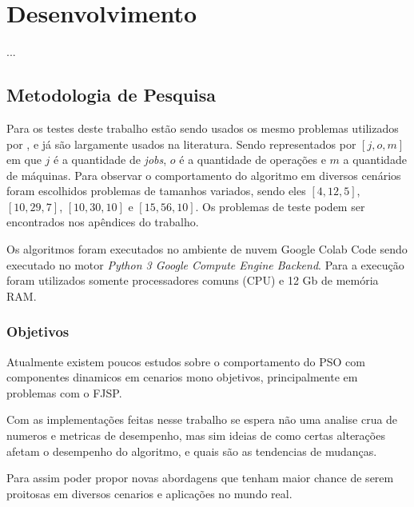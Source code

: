\chapter{Desenvolvimento}
    ...


\section{Metodologia de Pesquisa}
        Para os testes deste trabalho estão sendo usados os mesmo problemas utilizados por \cite{Kacem2002}, e já são largamente usados na literatura. Sendo representados por $[j, o, m]$ em que $j$ é a quantidade de \textit{jobs}, $o$ é a quantidade de operações e $m$ a quantidade de máquinas. Para observar o comportamento do algoritmo em diversos cenários foram escolhidos problemas de tamanhos variados, sendo eles $[4, 12, 5]$, $[10, 29, 7]$, $[10, 30, 10]$ e $[15, 56, 10]$. Os problemas de teste podem ser encontrados nos apêndices do trabalho.\newline

        Os algoritmos foram executados no ambiente de nuvem Google Colab Code sendo executado no motor \textit{Python 3 Google Compute Engine Backend}. Para a execução foram utilizados somente processadores comuns (CPU) e 12 Gb de memória RAM.

    \subsection{Objetivos}
        Atualmente existem poucos estudos sobre o comportamento do PSO com componentes dinamicos em cenarios mono objetivos, principalmente em problemas com o FJSP. \newline

        Com as implementações feitas nesse trabalho se espera não uma analise crua de numeros e metricas de desempenho, mas sim ideias de como certas alterações afetam o desempenho do algoritmo, e quais são as tendencias de mudanças. \newline
        
        Para assim poder propor novas abordagens que tenham maior chance de serem proitosas em diversos cenarios e aplicações no mundo real.


